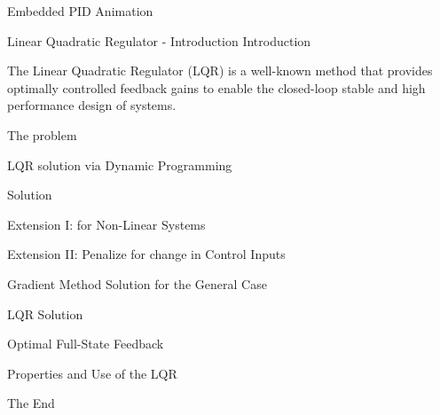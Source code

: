 \documentclass{beamer}
\begin{document}
\begin{frame}{Embedded PID Animation}

\end{frame}

\begin{frame}{Linear Quadratic Regulator - Introduction}
Introduction

The Linear Quadratic Regulator (LQR) is a well-known method that provides optimally controlled feedback gains to enable the closed-loop stable and high performance design of systems.

\end{frame}

\begin{frame}{The problem}

\end{frame}

\begin{frame}{LQR solution via Dynamic Programming}

\end{frame}

\begin{frame}{Solution}

\end{frame}

\begin{frame}{Extension I: for Non-Linear Systems}

\end{frame}

\begin{frame}{Extension II: Penalize for change in Control Inputs}

\end{frame}





\begin{frame}{Gradient Method Solution for the General Case}

\end{frame}


\begin{frame}{LQR Solution}

\end{frame}

\begin{frame}{Optimal Full-State Feedback}

\end{frame}


\begin{frame}{Properties and Use of the LQR }

\end{frame}







\begin{frame}
\Huge{\centerline{The End}}
\end{frame}

\end{document}
